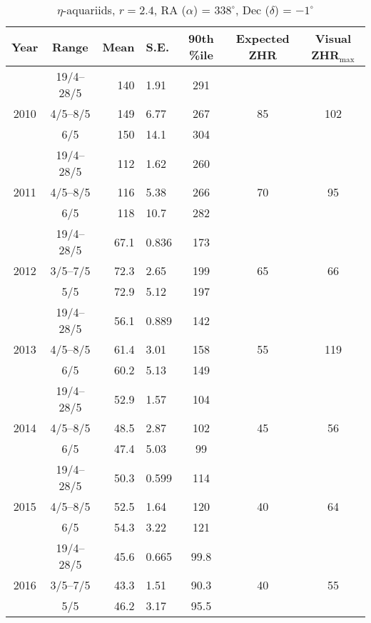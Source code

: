 \begin{table}[h!]
	\centering
	\begin{tabular}{|c|c|r@{ \,$\pm$\, }lc|cc|}
		\hline 
		Year & Range & Mean & S.E. & 90th \%ile & Expected ZHR & Visual ZHR$_{\text{max}}$ \\ 
		\hline	
		& 19/4--28/5& 140 & 1.91 & 291   & & \\ 
		2010 &4/5--8/5 &	149 & 6.77 & 267   & 85& 102\\ 
		& 6/5& 150 & 14.1 & 304   & & \\ 
		\hline 
		& 19/4--28/5& 112 & 1.62 & 260   & & \\ 
		2011 & 4/5--8/5& 116 & 5.38 & 266   & 70&95 \\ 
		& 6/5& 118 & 10.7 & 282   & & \\ 
		\hline 
		& 19/4--28/5& 67.1 & 0.836 & 173   & & \\ 
		2012 &3/5--7/5 & 72.3 & 2.65 & 199   & 65&66 \\ 
		& 5/5& 72.9 & 5.12 & 197   & & \\ 
		\hline 
		& 19/4--28/5& 56.1 & 0.889 & 142   & & \\ 
		2013 & 4/5--8/5& 61.4 & 3.01 & 158   & 55&119 \\ 
		& 6/5& 60.2 & 5.13 & 149   & & \\ 
		\hline 
		& 19/4--28/5& 52.9 & 1.57 & 104   & & \\ 
		2014 & 4/5--8/5& 48.5 & 2.87 & 102   & 45&56 \\ 
		& 6/5& 47.4 & 5.03 & 99  & & \\ 
		\hline 
		& 19/4--28/5& 50.3 & 0.599 & 114   & & \\ 
		2015 & 4/5--8/5& 52.5 & 1.64 & 120   &40 &64 \\ 
		& 6/5& 54.3 & 3.22 & 121   & & \\ 
		\hline
		& 19/4--28/5& 45.6 & 0.665 & 99.8	& & \\
		2016 & 3/5--7/5& 43.3 & 1.51 & 90.3   &40 &55 \\ 
		& 5/5& 46.2 & 3.17 & 95.5   & & \\ 
		\hline 
	\end{tabular}
	\caption{$\eta$-aquariids, $r = 2.4$, RA ($\alpha$) = $338^{\circ}$, Dec ($\delta$) = $-1^{\circ}$} 
\end{table}